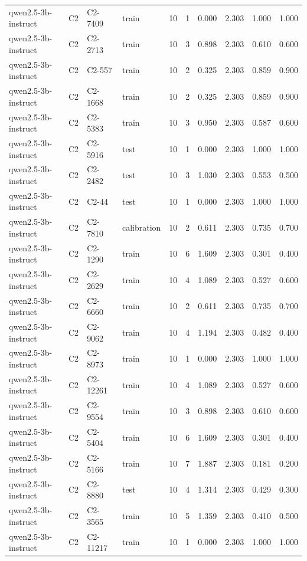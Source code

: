 \begin{table}
\begin{tabular}{llllrrrrrr}
qwen2.5-3b-instruct & C2 & C2-7409 & train & 10 & 1 & 0.000 & 2.303 & 1.000 & 1.000 \\
qwen2.5-3b-instruct & C2 & C2-2713 & train & 10 & 3 & 0.898 & 2.303 & 0.610 & 0.600 \\
qwen2.5-3b-instruct & C2 & C2-557 & train & 10 & 2 & 0.325 & 2.303 & 0.859 & 0.900 \\
qwen2.5-3b-instruct & C2 & C2-1668 & train & 10 & 2 & 0.325 & 2.303 & 0.859 & 0.900 \\
qwen2.5-3b-instruct & C2 & C2-5383 & train & 10 & 3 & 0.950 & 2.303 & 0.587 & 0.600 \\
qwen2.5-3b-instruct & C2 & C2-5916 & test & 10 & 1 & 0.000 & 2.303 & 1.000 & 1.000 \\
qwen2.5-3b-instruct & C2 & C2-2482 & test & 10 & 3 & 1.030 & 2.303 & 0.553 & 0.500 \\
qwen2.5-3b-instruct & C2 & C2-44 & test & 10 & 1 & 0.000 & 2.303 & 1.000 & 1.000 \\
qwen2.5-3b-instruct & C2 & C2-7810 & calibration & 10 & 2 & 0.611 & 2.303 & 0.735 & 0.700 \\
qwen2.5-3b-instruct & C2 & C2-1290 & train & 10 & 6 & 1.609 & 2.303 & 0.301 & 0.400 \\
qwen2.5-3b-instruct & C2 & C2-2629 & train & 10 & 4 & 1.089 & 2.303 & 0.527 & 0.600 \\
qwen2.5-3b-instruct & C2 & C2-6660 & train & 10 & 2 & 0.611 & 2.303 & 0.735 & 0.700 \\
qwen2.5-3b-instruct & C2 & C2-9062 & train & 10 & 4 & 1.194 & 2.303 & 0.482 & 0.400 \\
qwen2.5-3b-instruct & C2 & C2-8973 & train & 10 & 1 & 0.000 & 2.303 & 1.000 & 1.000 \\
qwen2.5-3b-instruct & C2 & C2-12261 & train & 10 & 4 & 1.089 & 2.303 & 0.527 & 0.600 \\
qwen2.5-3b-instruct & C2 & C2-9554 & train & 10 & 3 & 0.898 & 2.303 & 0.610 & 0.600 \\
qwen2.5-3b-instruct & C2 & C2-5404 & train & 10 & 6 & 1.609 & 2.303 & 0.301 & 0.400 \\
qwen2.5-3b-instruct & C2 & C2-5166 & train & 10 & 7 & 1.887 & 2.303 & 0.181 & 0.200 \\
qwen2.5-3b-instruct & C2 & C2-8880 & test & 10 & 4 & 1.314 & 2.303 & 0.429 & 0.300 \\
qwen2.5-3b-instruct & C2 & C2-3565 & train & 10 & 5 & 1.359 & 2.303 & 0.410 & 0.500 \\
qwen2.5-3b-instruct & C2 & C2-11217 & train & 10 & 1 & 0.000 & 2.303 & 1.000 & 1.000 \\

\end{tabular}
\end{table}
